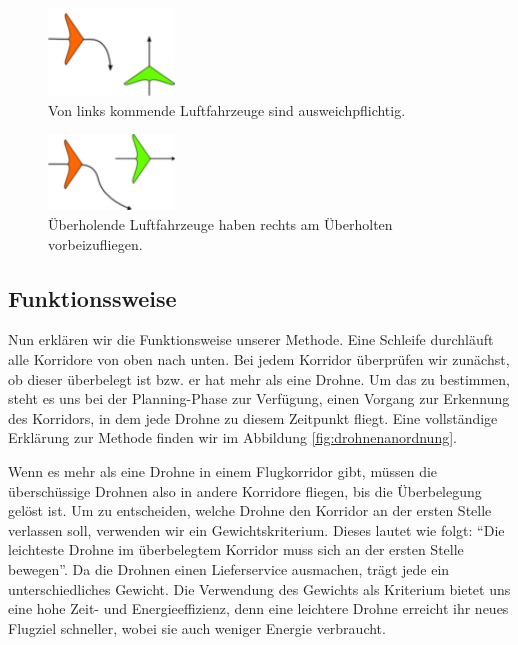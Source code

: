 \documentclass[a4paper,titlepage,onecolumn,twoside,12pt]{article}
\begin{document}
\begin{figure}
\centering
\includegraphics[width=0.3\textwidth]{120px-Crossing_rule}
\caption{Von links kommende Luftfahrzeuge sind ausweichpflichtig.}
\label{fig:cross}
\end{figure}


\begin{figure}
\centering
\includegraphics[width=0.3\textwidth]{120px-Overtaking_rule}
\caption{Überholende Luftfahrzeuge haben rechts am Überholten vorbeizufliegen.}
\label{fig:overtaking}
\end{figure}


\subsection{Funktionssweise}
\label{subsec:funktionssweise}
Nun erklären wir die Funktionsweise unserer Methode. Eine Schleife durchläuft alle Korridore von oben nach unten. Bei jedem Korridor überprüfen wir zunächst, ob dieser überbelegt ist bzw. er hat mehr als eine Drohne. Um das zu bestimmen, steht es uns bei der Planning-Phase zur Verfügung, einen Vorgang zur Erkennung des Korridors, in dem jede Drohne zu diesem Zeitpunkt fliegt. Eine vollständige Erklärung zur Methode finden wir im Abbildung \ref{fig:drohnenanordnung}.

Wenn es mehr als eine Drohne in einem Flugkorridor gibt, müssen die überschüssige Drohnen also in andere Korridore fliegen, bis die Überbelegung gelöst ist. Um zu entscheiden, welche Drohne den Korridor an der ersten Stelle verlassen soll, verwenden wir ein Gewichtskriterium. Dieses lautet wie folgt: "`Die leichteste Drohne im überbelegtem Korridor muss sich an der ersten Stelle bewegen"'. Da die Drohnen einen Lieferservice ausmachen, trägt jede ein unterschiedliches Gewicht. Die Verwendung des Gewichts als Kriterium bietet uns eine hohe Zeit- und Energieeffizienz, denn eine leichtere Drohne erreicht ihr neues Flugziel schneller, wobei sie auch weniger Energie verbraucht.
\end{document}
